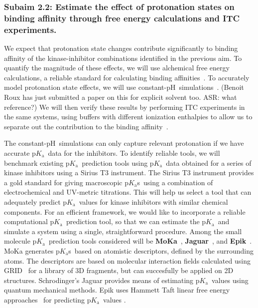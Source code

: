 \documentclass[10pt,final]{article}
\newcommand{\pKa}{p$K_\mathrm{a}$\ }
\newcommand{\pH}{p$\mathrm{H}$\ }
\newcommand{\pKas}{p$K_\mathrm{a}$s\ }
\begin{document}
\subsubsection*{Subaim 2.2: Estimate the effect of protonation states on binding affinity through free energy calculations and ITC experiments.}
We expect that protonation state changes contribute significantly to binding affinity of the kinase-inhibitor combinations identified in the previous aim.
%
To quantify the magnitude of these effects, we will use alchemical free energy calculations, a reliable standard for calculating binding affinities~\autocite{Fujitani2005a,Deng2006a,Wang2015a}.
%
To accurately model protonation state effects, we will use constant-\pH simulations~\autocite{Mongan2004a,Stern2007a,Nilmeier2011a}.
%
{\color{purple}(Benoit Roux has just submitted a paper on this for explicit solvent too. ASR: what reference?)}
%
We will then verify these results by performing ITC experiments in the same systems, using buffers with different ionization enthalpies to allow us to separate out the contribution to the binding affinity~\autocite{Baker1996a,Neeb2014a}.

The constant-\pH simulations can only capture relevant protonation if we have accurate \pKa data for the inhibitors.
%
To identify reliable tools, we will benchmark existing \pKa prediction tools using \pKa data obtained for a series of kinase inhibitors using a Sirius T3 instrument.
%
The Sirius T3 instrument provides a gold standard for giving macroscopic \pKas using a combination of electrochemical and UV-metric titrations.
%
This will help us select a tool that can adequately predict \pKa values for kinase inhibitors with similar chemical components.
%
For an efficient framework, we would like to incorporate a reliable computational \pKa prediction tool, so that we can estimate the \pKa and simulate a system using a single, straightforward procedure.
%
Among the small molecule \pKa prediction tools considered will be \textbf{MoKa}~\autocite{Milletti2007a}, \textbf{Jaguar}~\autocite{Bochevarov2013a}, and \textbf{Epik}~\autocite{Shelley2007a,Greenwood2010a}.
%
MoKa generates \pKas based on atomistic descriptors, defined by the surrounding atoms.
%
The descriptors are based on molecular interaction fields calculated using GRID~\autocite{Goodford1985a} for a library of 3D fragments, but can succesfully be applied on 2D structures.
%
Schrodinger's Jaguar provides means of estimating \pKa values using quantum mechanical methods.
%
Epik uses Hammett Taft linear free energy approaches~\autocite{Perrin1981a} for predicting \pKa values .
\end{document}
